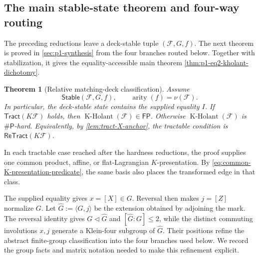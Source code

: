 \documentclass[11pt,letterpaper,onecolumn]{article}
\theoremstyle{plain}
\newtheorem{theorem}{Theorem}[section]
\theoremstyle{definition}
\theoremstyle{remark}
\newcommand{\cF}{\mathcal F}
\newcommand{\KHolant}{\operatorname{K\text{-}Holant}}
\newcommand{\Tract}{\mathsf{Tract}}
\newcommand{\ReTract}{\mathsf{ReTract}}
\newcommand{\Stable}{\mathsf{Stable}}
\newcommand{\FP}{\mathsf{FP}}
\newcommand{\SharpP}{\#\mathsf P}
\newcommand{\arity}{\operatorname{arity}}
\begin{document}
\subsection{The main stable-state theorem and four-way routing}
\label{sec:matching-decks}

The preceding reductions leave a deck-stable tuple
\((\cF,G,f)\).  The next theorem is proved in
\cref{sec:p1-synthesis} from the four branches routed below.  Together with
stabilization, it gives the equality-accessible main theorem
\cref{thm:p1-eq2-kholant-dichotomy}.

\begin{theorem}[Relative matching-deck classification]
\label{thm:matching-deck-classification}
Assume
\[
 \Stable(\cF,G,f),\qquad \arity(f)=\nu(\cF).
\]
In particular, the deck-stable state contains the supplied
equality \(I\).  If \(\Tract(K\cF)\) holds, then
\(\KHolant(\cF)\in\FP\). Otherwise \(\KHolant(\cF)\) is
\(\SharpP\)-hard.  Equivalently, by \cref{lem:tract-X-anchor}, the
tractable condition is \(\ReTract(K\cF)\).
\end{theorem}

In each tractable case reached after the hardness reductions, the proof
supplies one common product, affine, or flat-Lagrangian
\(K\)-presentation. By \cref{eq:common-K-presentation-predicate}, the same
basis also places the transformed edge in that class.

The supplied equality gives \(x=[X]\in G\). Reversal then makes
\(j=[Z]\) normalize \(G\). Let \(\widehat G:=\langle G,j\rangle\) be the
extension obtained by adjoining the mark. The reversal identity gives
\(G\triangleleft \widehat G\) and \([\widehat G:G]\le2\), while the distinct commuting
involutions \(x,j\) generate a Klein-four subgroup of \(\widehat G\).
Their positions refine the abstract finite-group classification into the
four branches used below. We record the group facts and matrix notation
needed to make this refinement explicit.
\label{sec:marked-finite-groups}
\end{document}
